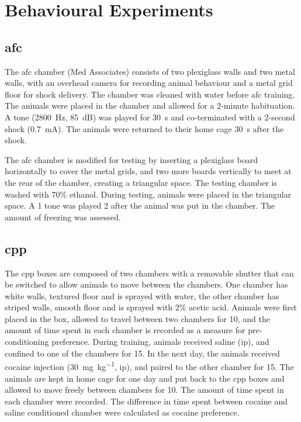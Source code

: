 \section{Behavioural Experiments}

\subsection{\Acrlong{afc}}\label{methods.afc}

The \gls{afc} chamber (Med Associates) consists of two plexiglass walls and two metal walls, with an overhead camera for recording animal behaviour and a metal grid floor for shock delivery. The chamber was cleaned with water before \gls{afc} training. The animals were placed in the chamber and allowed for a 2-minute habituation. A tone (\SI{2800}{\Hz}, \SI{85}{\dB}) was played for \SI{30}{\second} and co-terminated with a 2-second shock (\SI{0.7}{\mA}). The animals were returned to their home cage \SI{30}{\second} after the shock.

The \gls{afc} chamber is modified for testing by inserting a plexiglass board horizontally to cover the metal grids, and two more boards vertically to meet at the rear of the chamber, creating a triangular space. The testing chamber is washed with 70\% ethanol. During testing, animals were placed in the triangular space. A \SI{1}{\min} tone was played \SI{2}{\min} after the animal was put in the chamber. The amount of freezing was assessed.

\subsection{\Acrlong{cpp}}\label{methods.cpp}

 The \gls{cpp} boxes are composed of two chambers with a removable shutter that can be switched to allow animals to move between the chambers. One chamber has white walls, textured floor and is sprayed with water, the other chamber has striped walls, smooth floor and is sprayed with 2\% acetic acid. Animals were first placed in the box, allowed to travel between two chambers for \SI{10}{\min}, and the amount of time spent in each chamber is recorded as a measure for pre-conditioning preference. During training, animals received saline (\gls{ip}), and confined to one of the chambers for \SI{15}{\min}. In the next day, the animals received cocaine injection (\SI{30}{\mg\per\kg}, \gls{ip}), and paired to the other chamber for \SI{15}{\min}. The animals are kept in home cage for one day and put back to the \gls{cpp} boxes and allowed to move freely between chambers for \SI{10}{\min}. The amount of time spent in each chamber were recorded. The difference in time spent between cocaine and saline conditioned chamber were calculated as cocaine preference.
